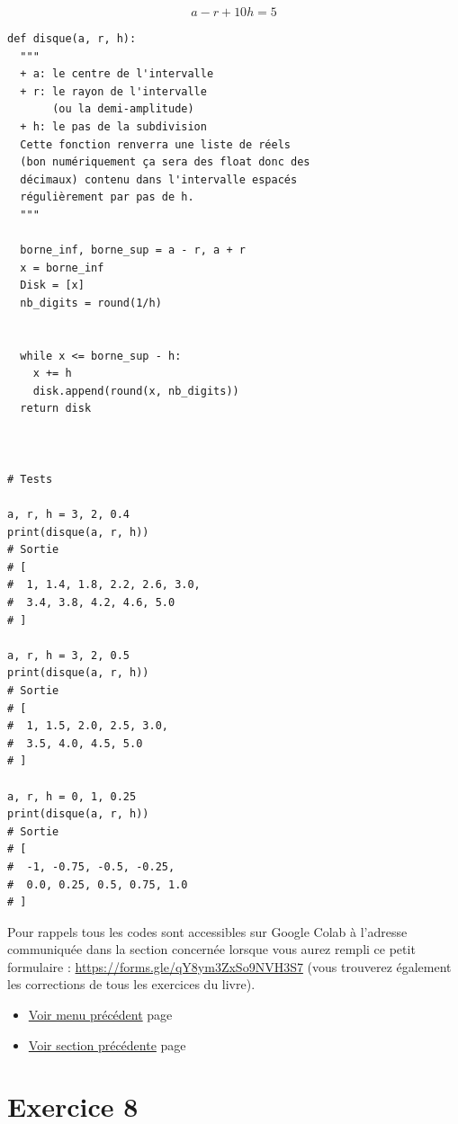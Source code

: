 \documentclass[a4paper,11pt]{book}
\begin{document}
\[a - r + 10h = 5\]


\clearpage

\begin{verbatim}
def disque(a, r, h):
  """
  + a: le centre de l'intervalle
  + r: le rayon de l'intervalle
       (ou la demi-amplitude)
  + h: le pas de la subdivision
  Cette fonction renverra une liste de réels
  (bon numériquement ça sera des float donc des
  décimaux) contenu dans l'intervalle espacés
  régulièrement par pas de h.
  """

  borne_inf, borne_sup = a - r, a + r
  x = borne_inf
  Disk = [x]
  nb_digits = round(1/h)


  while x <= borne_sup - h:
    x += h
    disk.append(round(x, nb_digits))
  return disk



# Tests

a, r, h = 3, 2, 0.4
print(disque(a, r, h))
# Sortie
# [
#  1, 1.4, 1.8, 2.2, 2.6, 3.0,
#  3.4, 3.8, 4.2, 4.6, 5.0
# ]

a, r, h = 3, 2, 0.5
print(disque(a, r, h))
# Sortie
# [
#  1, 1.5, 2.0, 2.5, 3.0,
#  3.5, 4.0, 4.5, 5.0
# ]

a, r, h = 0, 1, 0.25
print(disque(a, r, h))
# Sortie 
# [
#  -1, -0.75, -0.5, -0.25,
#  0.0, 0.25, 0.5, 0.75, 1.0
# ]
\end{verbatim}

\clearpage

Pour rappels tous les codes sont accessibles sur Google Colab à
l'adresse communiquée dans la section concernée lorsque vous
aurez rempli ce petit formulaire : \url{https://forms.gle/qY8ym3ZxSo9NVH3S7}
(vous trouverez également les corrections de tous les exercices du livre).



\begin{itemize}
\item \hyperref[orgb78d1c3]{Voir menu précédent}
page~\pageref{page:content4-menu}
\item \hyperref[org69ab718]{Voir section précédente}
page~\pageref{page:sec2.4.3persp}
\end{itemize}

\clearpage

\section{Exercice 8}
\label{sec:org3c9d2ef}
\label{org71eb39f}
\label{page:sec2.4.5exo8}
\end{document}
